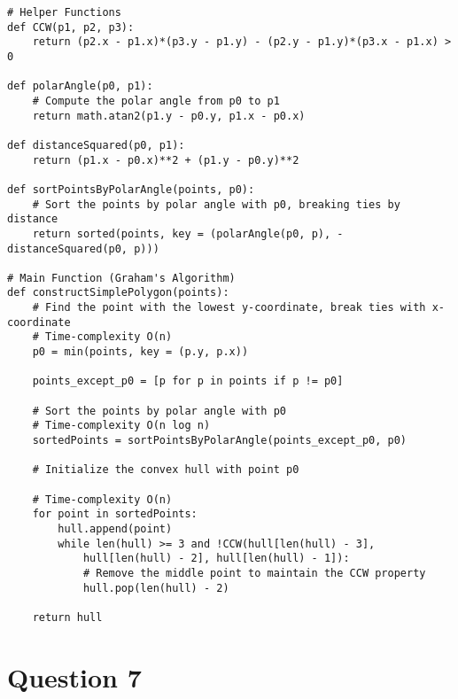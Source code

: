 \documentclass{article}
\begin{document}
\begin{verbatim}
# Helper Functions
def CCW(p1, p2, p3):
    return (p2.x - p1.x)*(p3.y - p1.y) - (p2.y - p1.y)*(p3.x - p1.x) > 0

def polarAngle(p0, p1):
    # Compute the polar angle from p0 to p1
    return math.atan2(p1.y - p0.y, p1.x - p0.x)

def distanceSquared(p0, p1):
    return (p1.x - p0.x)**2 + (p1.y - p0.y)**2

def sortPointsByPolarAngle(points, p0):
    # Sort the points by polar angle with p0, breaking ties by distance
    return sorted(points, key = (polarAngle(p0, p), -distanceSquared(p0, p)))

# Main Function (Graham's Algorithm)
def constructSimplePolygon(points):
    # Find the point with the lowest y-coordinate, break ties with x-coordinate
    # Time-complexity O(n)
    p0 = min(points, key = (p.y, p.x))

    points_except_p0 = [p for p in points if p != p0]

    # Sort the points by polar angle with p0
    # Time-complexity O(n log n)
    sortedPoints = sortPointsByPolarAngle(points_except_p0, p0)

    # Initialize the convex hull with point p0

    # Time-complexity O(n)
    for point in sortedPoints:
        hull.append(point)
        while len(hull) >= 3 and !CCW(hull[len(hull) - 3], 
            hull[len(hull) - 2], hull[len(hull) - 1]):
            # Remove the middle point to maintain the CCW property
            hull.pop(len(hull) - 2)

    return hull
\end{verbatim}

\newpage

\section*{Question 7}
\end{document}

